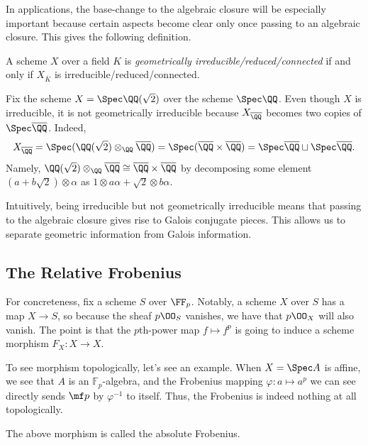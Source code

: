 \documentclass[../notes.tex]{subfiles}
\begin{document}
In applications, the base-change to the algebraic closure will be especially important because certain aspects become clear only once passing to an algebraic closure. This gives the following definition.
\begin{defihelper}   
	A scheme $X$ over a field $K$ is \textit{geometrically irreducible/reduced/connected} if and only if $X_{\overline K}$ is irreducible/reduced/connected.
\end{defihelper}
\begin{example}
	Fix the scheme $X=\Spec\QQ(\sqrt2)$ over the scheme $\Spec\QQ$. Even though $X$ is irreducible, it is not geometrically irreducible because $X_{\overline\QQ}$ becomes two copies of $\Spec\overline\QQ$. Indeed,
	\[X_{\overline\QQ}=\Spec(\QQ(\sqrt2)\otimes_\QQ\overline\QQ)=\Spec(\overline\QQ\times\overline\QQ)=\Spec\overline\QQ\sqcup\Spec\overline\QQ.\]
	Namely, $\QQ(\sqrt2)\otimes_\QQ\overline\QQ\cong\overline\QQ\times\overline\QQ$ by decomposing some element $(a+b\sqrt2)\otimes\alpha$ as $1\otimes a\alpha+\sqrt2\otimes b\alpha$.
\end{example}
Intuitively, being irreducible but not geometrically irreducible means that passing to the algebraic closure gives rise to Galois conjugate pieces. This allows us to separate geometric information from Galois information.

\subsection{The Relative Frobenius}
For concreteness, fix a scheme $S$ over $\FF_p$. Notably, a scheme $X$ over $S$ has a map $X\to S$, so because the sheaf $p\OO_S$ vanishes, we have that $p\OO_X$ will also vanish. The point is that the $p$th-power map $f\mapsto f^p$ is going to induce a scheme morphism $F_X\colon X\to X$.

To see morphism topologically, let's see an example. When $X=\Spec A$ is affine, we see that $A$ is an $\mathbb F_p$-algebra, and the Frobenius mapping $\varphi\colon a\mapsto a^p$ we can see directly sends $\mf p$ by $\varphi^{-1}$ to itself. Thus, the Frobenius is indeed nothing at all topologically.
\begin{remark}
	The above morphism is called the absolute Frobenius.
\end{remark}
\end{document}
